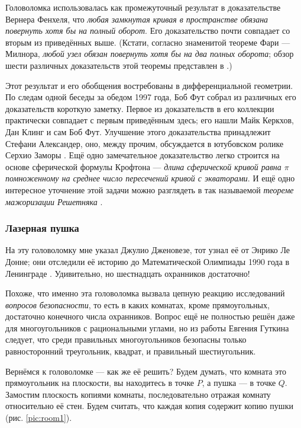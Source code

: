 \begin{addedbytheeditors}
Головоломка использовалась как промежуточный результат \cite[Satz I$'$]{fenchel}
в доказательстве Вернера Фенхеля, что \emph{любая замкнутая кривая в пространстве обязана повернуть хотя бы на полный оборот}.
Его доказательство почти совпадает со вторым из приведённых выше.
(Кстати, согласно знаменитой теореме Фари --- Милнора, \emph{любой узел обязан повернуть хотя бы на два полных оборота}; обзор шести различных доказательств этой теоремы представлен в \cite{petrunin-stadler}.)

Этот результат и его обобщения востребованы в дифференциальной геометрии.
По следам одной беседы за обедом 1997 года, Боб Фут собрал из различных его доказательств короткую заметку.
Первое из доказательств в его коллекции практически совпадает с первым приведённым здесь;
его нашли Майк Керкхов, Дан Клинг и сам Боб Фут.
Улучшение этого доказательства принадлежит Стефани Александер, оно, между прочим, обсуждается в ютубовском ролике Серхио Заморы \cite{zamora}.
Ещё одно замечательное доказательство легко строится на основе сферической формулы Крофтона --- \emph{длина сферической кривой равна $\pi$ помноженному на среднее число пересечений кривой с экваторами}.
И ещё одно интересное уточнение этой задачи можно разглядеть в так называемой \emph{теореме мажоризации Решетняка} \cite{reshetnyak}.\pr
\end{addedbytheeditors}

\subsubsection*{Лазерная пушка}

На эту головоломку мне указал Джулио Дженовезе, тот узнал её от Энрико Ле Донне;
они отследили её историю до Математической Олимпиады 1990 года в Ленинграде \cite{17}.
Удивительно, но шестнадцать охранников достаточно!

Похоже, что именно эта головоломка вызвала цепную реакцию исследований \emph{вопросов безопасности}, то есть в каких комнатах, кроме прямоугольных, достаточно конечного числа охранников.
Вопрос ещё не полностью решён даже для многоугольников с рациональными углами, но из работы Евгения Гуткина \cite{34} следует, что среди правильных многоугольников безопасны только равносторонний треугольник, квадрат, и правильный шестиугольник.

Вернёмся к головоломке --- как же её решить?
Будем думать, что комната это прямоугольник на плоскости, вы находитесь в точке $P$, а пушка --- в точке $Q$.
Замостим плоскость копиями комнаты, последовательно отражая комнату относительно её стен.
Будем считать, что каждая копия содержит копию пушки (рис. \ref{pic:room1}).

